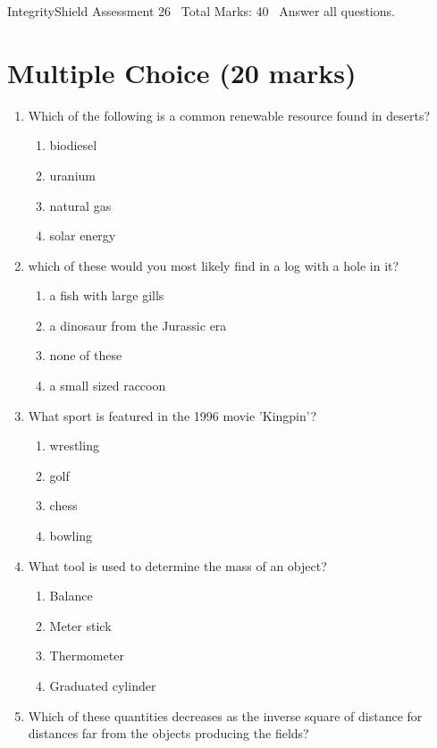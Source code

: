 \documentclass[12pt]{article}
\begin{document}
\begin{center}
IntegrityShield Assessment 26 \
Total Marks: 40 \
Answer all questions.
\end{center}

\section*{Multiple Choice (20 marks)}
\begin{enumerate}[label=\arabic*.]
\item Which of the following is a common renewable resource found in deserts?
\begin{enumerate}[label=(\alph*)]
    \item biodiesel
    \item uranium
    \item natural gas
    \item solar energy
\end{enumerate}
\item which of these would you most likely find in a log with a hole in it?
\begin{enumerate}[label=(\alph*)]
    \item a fish with large gills
    \item a dinosaur from the Jurassic era
    \item none of these
    \item a small sized raccoon
\end{enumerate}
\item What sport is featured in the 1996 movie 'Kingpin'?
\begin{enumerate}[label=(\alph*)]
    \item wrestling
    \item golf
    \item chess
    \item bowling
\end{enumerate}
\item What tool is used to determine the mass of an object?
\begin{enumerate}[label=(\alph*)]
    \item Balance
    \item Meter stick
    \item Thermometer
    \item Graduated cylinder
\end{enumerate}
\item Which of these quantities decreases as the inverse square of distance for distances far from the objects producing the fields?

\end{enumerate}
\end{document}
